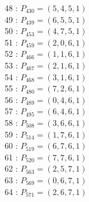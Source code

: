 \documentclass{article}
\begin{document}
{\begin{multicols}{3}
48 : $P_{430}=( 5, 4, 5, 1 )$\\
49 : $P_{439}=( 6, 5, 5, 1 )$\\
50 : $P_{453}=( 4, 7, 5, 1 )$\\
51 : $P_{459}=( 2, 0, 6, 1 )$\\
52 : $P_{466}=( 1, 1, 6, 1 )$\\
53 : $P_{467}=( 2, 1, 6, 1 )$\\
54 : $P_{468}=( 3, 1, 6, 1 )$\\
55 : $P_{480}=( 7, 2, 6, 1 )$\\
56 : $P_{489}=( 0, 4, 6, 1 )$\\
57 : $P_{495}=( 6, 4, 6, 1 )$\\
58 : $P_{508}=( 3, 6, 6, 1 )$\\
59 : $P_{514}=( 1, 7, 6, 1 )$\\
60 : $P_{519}=( 6, 7, 6, 1 )$\\
61 : $P_{520}=( 7, 7, 6, 1 )$\\
62 : $P_{563}=( 2, 5, 7, 1 )$\\
63 : $P_{569}=( 0, 6, 7, 1 )$\\
64 : $P_{571}=( 2, 6, 7, 1 )$\\
\end{multicols}


%


%


}%
\end{document}
